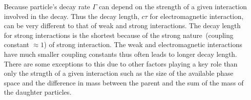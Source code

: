 Because particle's decay rate $\Gamma$ can depend on the strength of a given interaction involved in the decay. Thus the decay length, $c\tau$  for electromagnetic interaction, can be very different to that of weak and strong interactions. The decay length for strong interactions is the shortest because of the strong nature~(coupling constant $\approx 1$) of strong interaction. The weak and electromagnetic interactions have much smaller coupling constants thus often leads to longer decay length. There are some exceptions to this due to other factors playing a key role than only the strngth of a given interaction such as the size of the available phase space and the difference in mass between the parent and the sum of the mass of the daughter particles.
